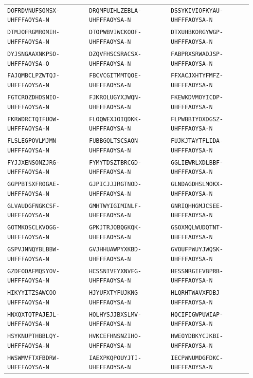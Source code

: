 {\begin{longtable}{@{}lll@{}}
\texttt{DOFRDVNUFSOMSX-UHFFFAOYSA-N} & \texttt{DRQMFUIHLZEBLA-UHFFFAOYSA-N} & \texttt{DSSYKIVIOFKYAU-UHFFFAOYSA-N} \\
\texttt{DTMJOFRGMROMIH-UHFFFAOYSA-N} & \texttt{DTOPWBVIWCKOOF-UHFFFAOYSA-N} & \texttt{DTXUHBKORGYWGP-UHFFFAOYSA-N} \\
\texttt{DYJSNGAAXNKPSO-UHFFFAOYSA-O} & \texttt{DZQVFHSCSRACSX-UHFFFAOYSA-N} & \texttt{FABPRXSRWADJSP-UHFFFAOYSA-N} \\
\texttt{FAJQMBCLPZWTQJ-UHFFFAOYSA-N} & \texttt{FBCVCGITMMTQOE-UHFFFAOYSA-N} & \texttt{FFXACJXHTYFMFZ-UHFFFAOYSA-N} \\
\texttt{FGTCROZDHDSNIO-UHFFFAOYSA-N} & \texttt{FJKROLUGYXJWQN-UHFFFAOYSA-N} & \texttt{FKEWKDVMOYICDP-UHFFFAOYSA-N} \\
\texttt{FKRWDRCTQIFUOW-UHFFFAOYSA-N} & \texttt{FLOQWEXJOIQDKK-UHFFFAOYSA-N} & \texttt{FLPWBBIYOXDGSZ-UHFFFAOYSA-N} \\
\texttt{FLSLEGPOVLMJMN-UHFFFAOYSA-N} & \texttt{FUBBGQLTSCSAON-UHFFFAOYSA-N} & \texttt{FUJKJTAYTFLIDA-UHFFFAOYSA-N} \\
\texttt{FYJJXENSONZJRG-UHFFFAOYSA-N} & \texttt{FYMYTDSZTBRCGD-UHFFFAOYSA-N} & \texttt{GGLIEWRLXDLBBF-UHFFFAOYSA-N} \\
\texttt{GGPPBTSXFROGAE-UHFFFAOYSA-N} & \texttt{GJPICJJJRGTNOD-UHFFFAOYSA-N} & \texttt{GLNDAGDHSLMOKX-UHFFFAOYSA-N} \\
\texttt{GLVAUDGFNGKCSF-UHFFFAOYSA-N} & \texttt{GMHTWYIGIMINLF-UHFFFAOYSA-N} & \texttt{GNRIQHHGMJCSEE-UHFFFAOYSA-N} \\
\texttt{GOTMKOSCLKVOGG-UHFFFAOYSA-N} & \texttt{GPKJTRJOBQGKQK-UHFFFAOYSA-N} & \texttt{GSOXMQLWUDQTNT-UHFFFAOYSA-N} \\
\texttt{GSPVJNNQYBLBBW-UHFFFAOYSA-N} & \texttt{GVJHHUAWPYXKBD-UHFFFAOYSA-N} & \texttt{GVOUFPWUYJWQSK-UHFFFAOYSA-N} \\
\texttt{GZDFOOAFMQSYOV-UHFFFAOYSA-N} & \texttt{HCSSNIVEYXNVFG-UHFFFAOYSA-N} & \texttt{HESSNRGIEVBPRB-UHFFFAOYSA-N} \\
\texttt{HIKYYITZSAWCOO-UHFFFAOYSA-N} & \texttt{HJYUFXTYFUJKNG-UHFFFAOYSA-N} & \texttt{HLQRHTWAVXFDBJ-UHFFFAOYSA-N} \\
\texttt{HNXQXTQTPAJEJL-UHFFFAOYSA-N} & \texttt{HOLHYSJJBXSLMV-UHFFFAOYSA-N} & \texttt{HQCIFIGWPUWIAP-UHFFFAOYSA-N} \\
\texttt{HSYKNUPTHBBLQY-UHFFFAOYSA-N} & \texttt{HVKCEFHNSNZIHO-UHFFFAOYSA-N} & \texttt{HWEOYDBKYCJKBI-UHFFFAOYSA-N} \\
\texttt{HWSWMVFTXFBDRW-UHFFFAOYSA-N} & \texttt{IAEXPKQPOUYJTI-UHFFFAOYSA-N} & \texttt{IECPWNUMDGFDKC-UHFFFAOYSA-N} \\

\end{longtable}}
